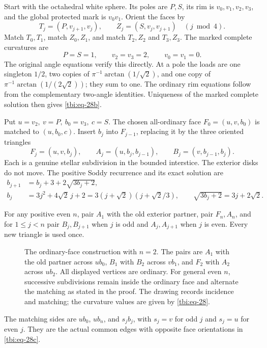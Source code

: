 Start with the octahedral white sphere. Its poles are \(P,S\), its rim is \(v_0,v_1,v_2,v_3\), and the global protected mark is \(v_0v_1\). Orient the faces by
\begin{equation}\label{tbi:eq-28a}
T_j=(P,v_{j+1},v_j),\qquad Z_j=(S,v_j,v_{j+1})
\quad(j\bmod4).
\end{equation}
Match \(T_0,T_1\), match \(Z_0,Z_1\), and match \(T_2,Z_2\) and \(T_3,Z_3\). The marked complete curvatures are
\begin{equation}\label{tbi:eq-28b}
P=S=1,\qquad v_2=v_3=2,\qquad v_0=v_1=0.
\end{equation}
The original angle equations verify this directly. At a pole the loads are one singleton \(1/2\), two copies of \(\pi^{-1}\arctan(1/\sqrt2)\), and one copy of \(\pi^{-1}\arctan(1/(2\sqrt2))\); they sum to one. The ordinary rim equations follow from the complementary two-angle identities. Uniqueness of the marked complete solution then gives \eqref{tbi:eq-28b}.

Put \(u=v_2,\ v=P,\ b_0=v_3,\ c=S\). The chosen all-ordinary face \(F_0=(u,v,b_0)\) is matched to \((u,b_0,c)\). Insert \(b_j\) into \(F_{j-1}\), replacing it by the three oriented triangles
\begin{equation}\label{tbi:eq-28c}
F_j=(u,v,b_j),\qquad A_j=(u,b_j,b_{j-1}),\qquad
B_j=(v,b_{j-1},b_j).
\end{equation}
Each is a genuine stellar subdivision in the bounded interstice. The exterior disks do not move. The positive Soddy recurrence and its exact solution are
\begin{equation}\label{tbi:eq-28}
\begin{aligned}
b_{j+1}&=b_j+3+2\sqrt{3b_j+2},\\
b_j&=3j^2+4\sqrt2\,j+2
   =3(j+\sqrt2)(j+\sqrt2/3),\qquad
\sqrt{3b_j+2}=3j+2\sqrt2.
\end{aligned}
\end{equation}

For any positive even \(n\), pair \(A_1\) with the old exterior partner, pair \(F_n,A_n\), and for \(1\le j<n\) pair \(B_j,B_{j+1}\) when \(j\) is odd and \(A_j,A_{j+1}\) when \(j\) is even. Every new triangle is used once.

\begin{figure}[htbp]
\centering

\caption{The ordinary-face construction with \(n=2\).
The pairs are \(A_1\) with the old partner across \(ub_0\),
\(B_1\) with \(B_2\) across \(vb_1\), and \(F_2\) with \(A_2\)
across \(ub_2\). All displayed vertices are ordinary.
For general even \(n\), successive subdivisions remain inside the
ordinary face and alternate the matching as stated in the proof.
The drawing records incidence and matching; the curvature values
are given by \eqref{tbi:eq-28}.}
\label{fig:ordinary-triangular-zigzag}
\end{figure}
 The matching sides are \(ub_0\), \(ub_n\), and \(s_jb_j\), with \(s_j=v\) for odd \(j\) and \(s_j=u\) for even \(j\). They are the actual common edges with opposite face orientations in \eqref{tbi:eq-28c}.


